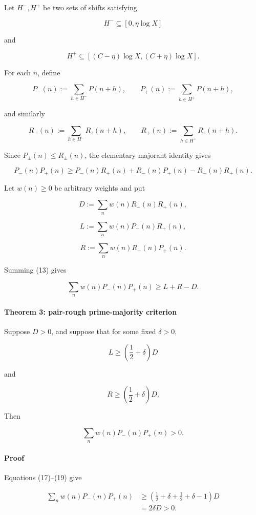 Let \(H^-,H^+\) be two sets of shifts satisfying

\[
H^-\subseteq[0,\eta\log X]
\]

and

\[
H^+\subseteq[(C-\eta)\log X,(C+\eta)\log X].
\]

For each \(n\), define

\[
P_-(n):=\sum_{h\in H^-}P(n+h),
\qquad
P_+(n):=\sum_{h\in H^+}P(n+h),
\]

and similarly

\[
R_-(n):=\sum_{h\in H^-}R_z(n+h),
\qquad
R_+(n):=\sum_{h\in H^+}R_z(n+h).
\]

Since \(P_\pm(n)\le R_\pm(n)\), the elementary majorant identity gives

\[
P_-(n)P_+(n)
\ge
P_-(n)R_+(n)
+
R_-(n)P_+(n)
-
R_-(n)R_+(n).
\tag{13}
\]

Let \(w(n)\ge0\) be arbitrary weights and put

\[
D:=\sum_nw(n)R_-(n)R_+(n),
\tag{14}
\]

\[
L:=\sum_nw(n)P_-(n)R_+(n),
\tag{15}
\]

\[
R:=\sum_nw(n)R_-(n)P_+(n).
\tag{16}
\]

Summing (13) gives

\[
\boxed{
\sum_nw(n)P_-(n)P_+(n)\ge L+R-D.
}
\tag{17}
\]

\paragraph{Theorem 3: pair-rough prime-majority criterion}

Suppose \(D>0\), and suppose that for some fixed \(\delta>0\),

\[
L\ge\left(\frac12+\delta\right)D
\tag{18}
\]

and

\[
R\ge\left(\frac12+\delta\right)D.
\tag{19}
\]

Then

\[
\sum_nw(n)P_-(n)P_+(n)>0.
\]

\paragraph{Proof}

Equations (17)--(19) give

\[
\begin{aligned}
\sum_nw(n)P_-(n)P_+(n)
&\ge
\left(
\frac12+\delta+
\frac12+\delta-1
\right)D\\
&=
2\delta D>0.
\end{aligned}
\]


